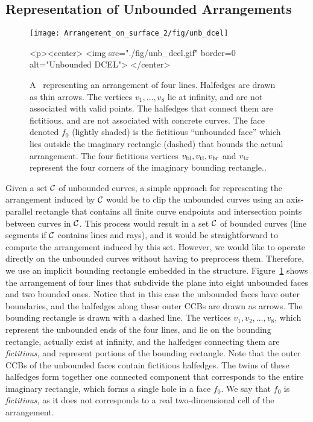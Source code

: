 \begin{ccAdvanced}

\subsection{Representation of Unbounded Arrangements\label{arr_ssec:unb_rep}}

\begin{figure}[t]
\begin{ccTexOnly}
  \begin{center}
  \texttt{[image: Arrangement\_on\_surface\_2/fig/unb\_dcel]}
  \end{center}
\end{ccTexOnly}
\begin{ccHtmlOnly}
  <p><center>
  <img src="./fig/unb_dcel.gif" border=0 alt="Unbounded DCEL">
  </center>
\end{ccHtmlOnly}
\caption{A \dcel\ representing an arrangement of four lines.
Halfedges are drawn as thin arrows. The vertices $v_1, \ldots, v_8$
lie at infinity, and are not associated with valid points. The
halfedges that connect them are fictitious, and are not associated
with concrete curves. The face denoted $f_0$ (lightly shaded)
is the fictitious ``unbounded face'' which lies outside the imaginary
rectangle (dashed) that bounds the actual arrangement. The four
fictitious vertices $v_{\rm bl}, v_{\rm tl}, v_{\rm br}$ and
$v_{\rm tr}$ represent the four corners of the imaginary bounding
rectangle..\label{arr_fig:unb_dcel}}
\end{figure}

Given a set ${\cal C}$ of unbounded curves, a simple approach for
representing the arrangement induced by ${\cal C}$ would be to clip the
unbounded curves using an axis-parallel rectangle that contains all
finite curve endpoints and intersection points between curves in
${\cal C}$. This process would result in a set ${\cal C}$ of bounded curves
(line segments if ${\cal C}$ contains lines and rays), and it would be
straightforward to compute the arrangement induced by this set.
However, we would like to operate directly on the unbounded curves
without having to preprocess them. Therefore, we use an implicit
bounding rectangle embedded in the \dcel{} structure.
Figure~\ref{arr_fig:unb_dcel} shows the arrangement of four lines
that subdivide the plane into eight unbounded faces and two bounded
ones. Notice that in this case the unbounded faces have outer
boundaries, and the halfedges along these outer CCBs are drawn as 
arrows. The bounding rectangle is drawn with a dashed line. The
vertices $v_1,v_2,\ldots,v_8$, which represent the unbounded ends of 
the four lines, and lie on the bounding rectangle, actually exist at
infinity, and the halfedges connecting them are \emph{fictitious}, and
represent portions of the bounding rectangle. Note that the outer CCBs
of the unbounded faces contain fictitious halfedges. The twins of these
halfedges form together one connected component that corresponds to
the entire imaginary rectangle, which forms a single hole in a face
$f_0$. We say that $f_0$ is \emph{fictitious}, as it does
not corresponds to a real two-dimensional cell of the arrangement.


\end{ccAdvanced}
